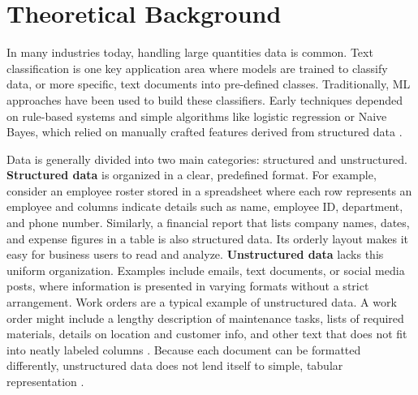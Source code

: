 \section{Theoretical Background}
In many industries today, handling large quantities data is common. Text classification is one key application area where models are trained to classify data, or more specific, text documents into pre-defined classes. Traditionally, ML approaches have been used to build these classifiers. Early techniques depended on rule-based systems and simple algorithms like logistic regression or Naive Bayes, which relied on manually crafted features derived from structured data \cite{bing2011mining}. 

Data is generally divided into two main categories: structured and unstructured. \textbf{Structured data} is organized in a clear, predefined format. For example, consider an employee roster stored in a spreadsheet where each row represents an employee and columns indicate details such as name, employee ID, department, and phone number. Similarly, a financial report that lists company names, dates, and expense figures in a table is also structured data. Its orderly layout makes it easy for business users to read and analyze. \textbf{Unstructured data} lacks this uniform organization. Examples include emails, text documents, or social media posts, where information is presented in varying formats without a strict arrangement. Work orders are a typical example of unstructured data. A work order might include a lengthy description of maintenance tasks, lists of required materials, details on location and customer info, and other text that does not fit into neatly labeled columns \cite{ibm2023work}. Because each document can be formatted differently, unstructured data does not lend itself to simple, tabular representation \cite{ibm2025datadiff}.


